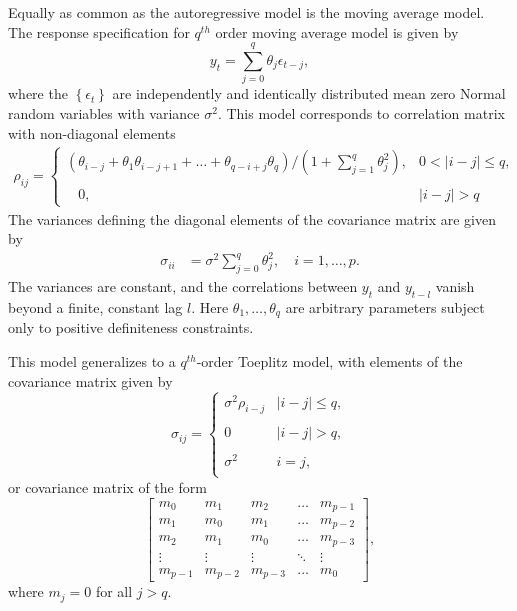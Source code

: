 Equally as common as the autoregressive model is the moving average model. The response specification for $q^{th}$ order moving average model  is given by 
\begin{equation}\label{eq:ma-q-model}
y_{t} = \sum_{j = 0}^{q} \theta_j \epsilon_{t-j},
\end{equation}
\noindent
where the $\left\{\epsilon_t\right\}$ are independently and identically distributed mean zero Normal random variables with variance $\sigma^2$. This model corresponds to correlation matrix with non-diagonal elements
\begin{align*}
\rho_{ij} = \left\{ \begin{array} {ll} \left(\theta_{i-j} + \theta_{1}\theta_{i-j +1} + \dots + \theta_{q-i+j}\theta_{q}\right)/\left(1 + \sum_{j = 1}^q \theta_j^2\right), & 0 < \vert i-j\vert \le q,\\ 
& \\
\phantom{\left(\right.}0, &  \vert i-j\vert > q \end{array}\right.
\end{align*}
\noindent
The variances defining the diagonal elements of the covariance matrix are given by 
\begin{align*}
\sigma_{ii} &= \sigma^2 \sum_{j = 0}^q \theta_j^2, \quad i = 1,\dots, p.
\end{align*}
The variances are constant, and the correlations between $y_t$ and $y_{t-l}$ vanish beyond a finite, constant lag $l$. Here $\theta_1,\dots, \theta_q$ are arbitrary parameters subject only to positive definiteness constraints. 

\bigskip

This model generalizes to a $q^{th}$-order Toeplitz model, with elements of the covariance matrix given by 
\begin{equation} \label{eq:toeplitz-covariance-model}
\sigma_{ij} = \left\{ \begin{array}{ll}
\sigma^2 \rho_{i-j} & \vert i - j \vert\le q, \\ 
&\\
0 & \vert i - j \vert >  q, \\ 
& \\
\sigma^2  & i = j,\\
\end{array}\right.
\end{equation}
\noindent
or covariance matrix of the form
\begin{equation} \label{eq:toeplitz-covariance-matrix}
\begin{bmatrix} m_0 & m_1 & m_2 & \dots & m_{p-1}\\ m_1 & m_0 & m_1 & \dots & m_{p-2}\\m_2 & m_1 & m_0 & \dots & m_{p-3}\\ \vdots & \vdots & \vdots & \ddots & \vdots\\  m_{p-1} & m_{p-2} & m_{p-3} & \dots & m_0 \end{bmatrix}, 
\end{equation}
\noindent
where $m_j = 0$ for all $j > q$. %

